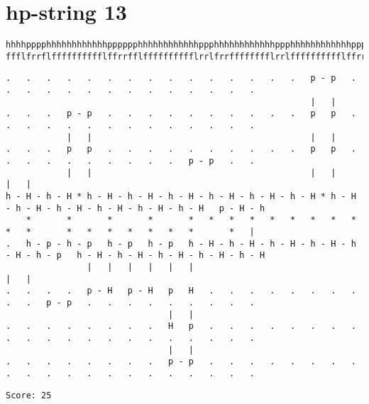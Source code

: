 \documentclass[a4paper,oneside,article,11pt]{memoir}
\begin{document}
\pagebreak

\section*{hp-string 13}
\begin{lstlisting}[basicstyle=\fontsize{7}{11}\ttfamily]
hhhhpppphhhhhhhhhhhhpppppphhhhhhhhhhhhppphhhhhhhhhhhhppphhhhhhhhhhhhppphpphhpphhpphph
ffflfrrflfffffffffflffrrfflfffffffffflrrlfrrfffffffflrrlfffffffffflffrrffllrrllrrlff
\end{lstlisting}
\begin{lstlisting}[basicstyle=\fontsize{1}{11}\ttfamily]
.   .   .   .   .   .   .   .   .   .   .   .   .   .   .   p - p   .   .   .   .   .   .   .   .   .   .   .   .   .   .
                                                            |   |
.   .   .   p - p   .   .   .   .   .   .   .   .   .   .   p   p   .   .   .   .   .   .   .   .   .   .   .   .   .   .
            |   |                                           |   |
.   .   .   p   p   .   .   .   .   .   .   .   .   .   .   p   p   .   .   .   .   .   .   .   .   .   .   p - p   .   .
            |   |                                           |   |                                           |   |
h - H - h - H * h - H - h - H - h - H - h - H - h - H - h - H * h - H - h - H - h - H - h - H - h - H - h - H   p - H - h
    *       *       *       *       *   *   *   *   *   *   *   *   *   *   *       *   *   *   *   *   *   *       *   |
.   h - p - h - p   h - p   h - p   h - H - h - H - h - H - h - H - h - H - h - p   h - H - h - H - h - H - h - H - h - H
                |   |   |   |   |   |                                           |   |
.   .   .   .   p - H   p - H   p   H   .   .   .   .   .   .   .   .   .   .   p - p   .   .   .   .   .   .   .   .   .
                                |   |
.   .   .   .   .   .   .   .   H   p   .   .   .   .   .   .   .   .   .   .   .   .   .   .   .   .   .   .   .   .   .
                                |   |
.   .   .   .   .   .   .   .   p - p   .   .   .   .   .   .   .   .   .   .   .   .   .   .   .   .   .   .   .   .   .
\end{lstlisting}
\begin{lstlisting}
Score: 25
\end{lstlisting}


\pagebreak
\end{document}
